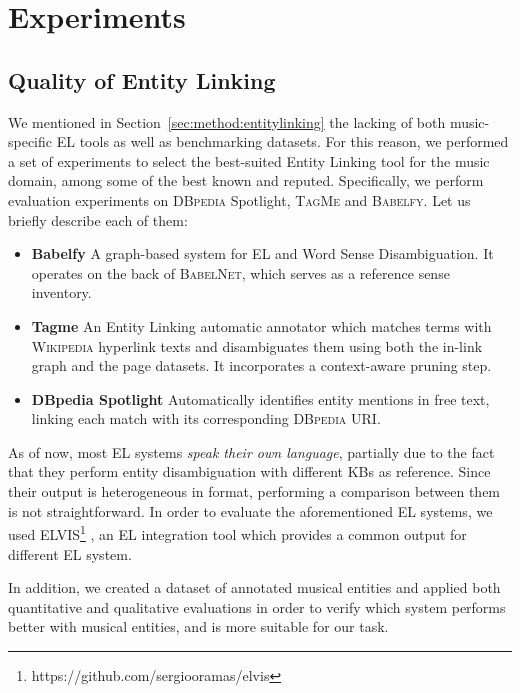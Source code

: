 \section{Experiments}
\label{experiments}

\subsection{Quality of Entity Linking}
\label{sec:qualityentitylinking}

We mentioned in Section~\ref{sec:method:entitylinking} the lacking of both music-specific \textsc{EL} tools as well as benchmarking datasets. For this reason, we performed a set of experiments to select the best-suited Entity Linking tool for the music domain, among some of the best known and reputed. Specifically, we perform evaluation experiments on \textsc{DBpedia} Spotlight, \textsc{TagMe} and \textsc{Babelfy}. Let us briefly describe each of them: 

\begin{itemize}
    \item \textbf{Babelfy} \cite{Moroetal2014} A graph-based system for \textsc{EL} and Word Sense Disambiguation. It operates on the back of \textsc{BabelNet}, which serves as a reference sense inventory.
    \item \textbf{Tagme} \cite{Ferraginaetal2010} An Entity Linking automatic annotator which matches terms with \textsc{Wikipedia} hyperlink texts and disambiguates them using both the in-link graph and the page datasets. It incorporates a context-aware pruning step.
    \item \textbf{DBpedia Spotlight} \cite{Mendes2011} Automatically identifies entity mentions in free text, linking each match with its corresponding \textsc{DBpedia} URI.
\end{itemize}


As of now, most \textsc{EL} systems \textit{speak their own language}, partially due to the fact that they perform entity disambiguation with different KBs as reference. Since their output is heterogeneous in format, performing a comparison between them is not straightforward. In order to evaluate the aforementioned EL systems, we used ELVIS\footnote{https://github.com/sergiooramas/elvis} \cite{Oramas2016}, an EL integration tool which provides a common output for different EL system.

In addition, we created a dataset of annotated musical entities and applied both quantitative and qualitative evaluations in order to verify which system performs better with musical entities, and is more suitable for our task.



